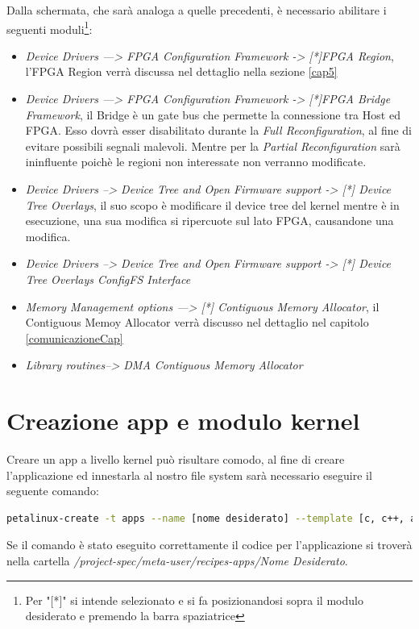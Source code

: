 Dalla schermata, che sarà analoga a quelle precedenti, è necessario abilitare i seguenti moduli\footnote{Per "[*]" si intende selezionato e si fa posizionandosi sopra il modulo desiderato e premendo la barra spaziatrice}:
\begin{itemize}
    \item \textit{Device Drivers ---> FPGA Configuration Framework -> [*]FPGA Region}, l'FPGA Region verrà discussa nel dettaglio nella sezione \ref{cap5}
    \item \textit{Device Drivers ---> FPGA Configuration Framework -> [*]FPGA Bridge Framework}, il Bridge è un gate bus che permette la connessione tra Host ed FPGA. Esso dovrà esser disabilitato durante la \textit{Full Reconfiguration}, al fine di evitare possibili segnali malevoli. Mentre per la \textit{Partial Reconfiguration} sarà ininfluente poichè le regioni non interessate non verranno modificate.
    \item \textit{Device Drivers --> Device Tree and Open Firmware support -> [*] Device Tree Overlays}, il suo scopo è modificare il device tree del kernel mentre è in esecuzione, una sua modifica si ripercuote sul lato FPGA, causandone una modifica.
    \item \textit{Device Drivers --> Device Tree and Open Firmware support -> [*] Device Tree Overlays ConfigFS Interface}
    \item \textit{Memory Management options ---> [*] Contiguous Memory Allocator}, il Contiguous Memoy Allocator verrà discusso nel dettaglio nel capitolo \ref{comunicazioneCap}
    \item \textit{Library routines--> DMA Contiguous Memory Allocator }
\end{itemize}

\section{Creazione app e modulo kernel}
Creare un app a livello kernel può risultare comodo, al fine di creare l'applicazione ed innestarla al nostro file system sarà necessario eseguire il seguente comando:
\begin{lstlisting}[language=sh, label=lst:creazioneApp, caption={Comando necessario alla creazione dell'applicazione, va eseguito nella cartella del progetto}]
petalinux-create -t apps --name [nome desiderato] --template [c, c++, autoconf, install]
\end{lstlisting}
Se il comando è stato eseguito correttamente il codice per l'applicazione si troverà nella cartella 
\textit{/project-spec/meta-user/recipes-apps/Nome Desiderato}.
